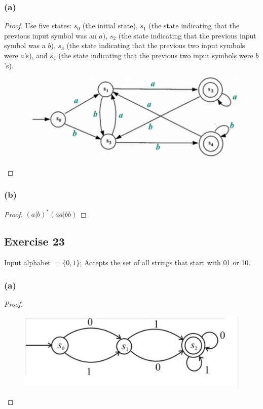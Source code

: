 \documentclass[14pt]{extarticle}
\begin{document}
\subsubsection{(a)}
\begin{proof}
    Use five states: \(s_0\) (the initial state), \(s_1\) (the state indicating that the previous input symbol was an \(a\)),
    \(s_2\) (the state indicating that the previous input symbol was a \(b\)), \(s_3\) (the state indicating that the previous
    two input symbols were \(a\)’s), and \(s_4\) (the state indicating that the previous two input symbols were \(b\)’s).

    \begin{figure}[ht!]
        \centering
        \includegraphics[scale=0.3]{../images/12.2.22.a.png}
    \end{figure}
\end{proof}

\subsubsection{(b)}
\begin{proof}
    \((a|b)^*(aa|bb)\)
\end{proof}

\subsection{Exercise 23}
Input alphabet \(= \{0, 1\}\); Accepts the set of all strings that start with 01 or 10.

\subsubsection{(a)}
\begin{proof}
    \begin{figure}[ht!]
        \centering
        \includegraphics[scale=0.3]{../images/12.2.23.a.png}
    \end{figure}
\end{proof}
\end{document}
